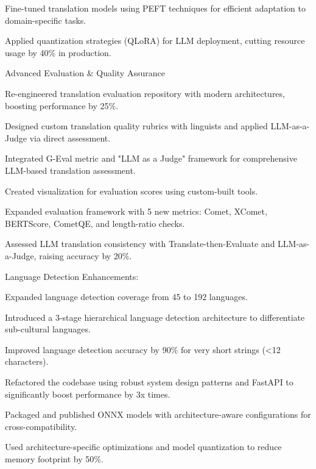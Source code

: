 \begin{cventries}
{\begin{cvitemswithheading}
        \item {Fine-tuned translation models using PEFT techniques for efficient adaptation to domain-specific tasks.}
        \item {Applied quantization strategies (QLoRA) for LLM deployment, cutting resource usage by 40\% in production.}
      \end{cvitemswithheading}
  }
  \cvexpproj
  {
    \begin{cvitemswithheading}
        {Advanced Evaluation \& Quality Assurance}
        \item {Re-engineered translation evaluation repository with modern architectures, boosting performance by 25\%.}
        \item {Designed custom translation quality rubrics with linguists and applied LLM-as-a-Judge via direct assessment.}
        \item {Integrated G-Eval metric and "LLM as a Judge" framework for comprehensive LLM-based translation assessment.}
        \item {Created visualization for evaluation scores using custom-built tools.}
        \item {Expanded evaluation framework with 5 new metrics: Comet, XComet, BERTScore, CometQE, and length-ratio checks.}
        \item {Assessed LLM translation consistency with Translate-then-Evaluate and LLM-as-a-Judge, raising accuracy by 20\%.}
    \end{cvitemswithheading}
  }
  \cvexpproj
  {
    \begin{cvitemswithheading}
        {Language Detection Enhancements:}
        \item {Expanded language detection coverage from 45 to 192 languages.}
        \item {Introduced a 3-stage hierarchical language detection architecture to differentiate sub-cultural languages.}
        \item {Improved language detection accuracy by 90\% for very short strings (<12 characters).}
        \item {Refactored the codebase using robust system design patterns and FastAPI to significantly boost performance by 3x times.}
        \item {Packaged and published ONNX models with architecture-aware configurations for cross-compatibility.}
        \item {Used architecture-specific optimizations and model quantization to reduce memory footprint by 50\%.}

\end{cvitemswithheading}}
\end{cventries}
